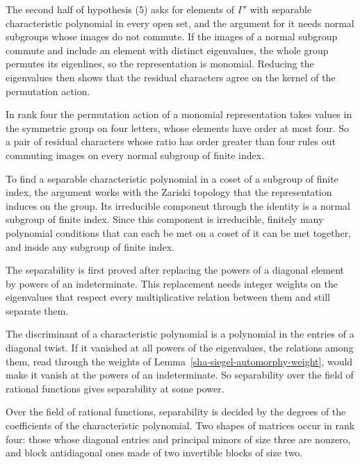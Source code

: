 The second half of hypothesis (5) asks for elements of $\Gamma'$ with separable characteristic polynomial in every open set, and the argument for it needs normal subgroups whose images do not commute. If the images of a normal subgroup commute and include an element with distinct eigenvalues, the whole group permutes its eigenlines, so the representation is monomial. Reducing the eigenvalues then shows that the residual characters agree on the kernel of the permutation action.

In rank four the permutation action of a monomial representation takes values in the symmetric group on four letters, whose elements have order at most four. So a pair of residual characters whose ratio has order greater than four rules out commuting images on every normal subgroup of finite index.

To find a separable characteristic polynomial in a coset of a subgroup of finite index, the argument works with the Zariski topology that the representation induces on the group. Its irreducible component through the identity is a normal subgroup of finite index. Since this component is irreducible, finitely many polynomial conditions that can each be met on a coset of it can be met together, and inside any subgroup of finite index.

The separability is first proved after replacing the powers of a diagonal element by powers of an indeterminate. This replacement needs integer weights on the eigenvalues that respect every multiplicative relation between them and still separate them.

The discriminant of a characteristic polynomial is a polynomial in the entries of a diagonal twist. If it vanished at all powers of the eigenvalues, the relations among them, read through the weights of Lemma~\ref{sha-siegel-automorphy-weight}, would make it vanish at the powers of an indeterminate. So separability over the field of rational functions gives separability at some power.

Over the field of rational functions, separability is decided by the degrees of the coefficients of the characteristic polynomial. Two shapes of matrices occur in rank four: those whose diagonal entries and principal minors of size three are nonzero, and block antidiagonal ones made of two invertible blocks of size two.

